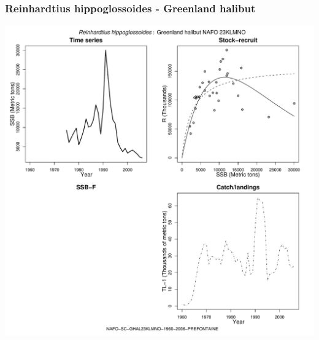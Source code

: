 \subsubsection{Reinhardtius hippoglossoides - Greenland halibut}
\begin{center}
\includegraphics[width=1.2\textwidth]{../R/figures/NAFO-SC-GHAL23KLMNO-1960-2006-PREFONTAINE.pdf}
\end{center}

